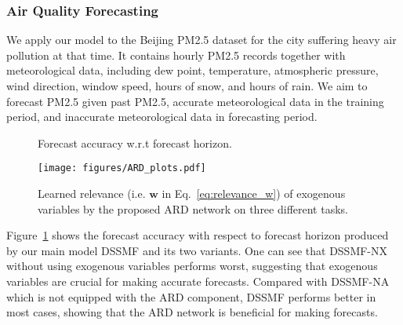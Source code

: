 \documentclass{article}
\begin{document}
\subsubsection{Air Quality Forecasting}
We apply our model to the Beijing PM2.5 dataset \cite{liang2015assessing} for the city suffering heavy air pollution at that time. It contains hourly PM2.5 records together with meteorological data, including dew point, temperature, atmospheric pressure, wind direction, window speed, hours of snow, and hours of rain. We aim to forecast PM2.5 given past PM2.5, accurate meteorological data in the training period, and inaccurate meteorological data in forecasting period.
\begin{figure}[!tb]
    \centering
    \caption{Forecast accuracy w.r.t forecast horizon.}
    \label{fig:horizons}
\end{figure}

\begin{figure}[!tb]
    \centering
    \texttt{[image: figures/ARD\_plots.pdf]}
    \caption{Learned relevance (i.e. $\mathbf{w}$ in Eq.~\ref{eq:relevance_w}) of exogenous variables by the proposed ARD network on three different tasks.}
    \label{fig:ARD_plot}
\end{figure}

Figure~\ref{fig:horizons} shows the forecast accuracy with respect to forecast horizon produced by our main model DSSMF and its two variants. One can see that DSSMF-NX without using exogenous variables performs worst, suggesting that exogenous variables are crucial for making accurate forecasts. Compared with DSSMF-NA which is not equipped with the ARD component, DSSMF performs better in most cases, showing that the ARD network is beneficial for making forecasts.
\end{document}
